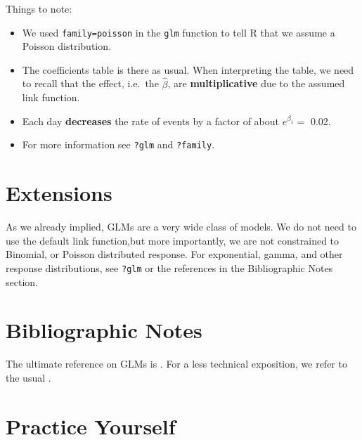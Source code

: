 \documentclass[]{book}
\providecommand{\tightlist}{%
  \setlength{\itemsep}{0pt}\setlength{\parskip}{0pt}}
\theoremstyle{definition}
\theoremstyle{definition}
\theoremstyle{definition}
\theoremstyle{remark}
\begin{document}
Things to note:

\begin{itemize}
\tightlist
\item
  We used \texttt{family=poisson} in the \texttt{glm} function to tell R
  that we assume a Poisson distribution.
\item
  The coefficients table is there as usual. When interpreting the table,
  we need to recall that the effect, i.e.~the \(\hat \beta\), are
  \textbf{multiplicative} due to the assumed link function.
\item
  Each day \textbf{decreases} the rate of events by a factor of about
  \(e^{\beta_1}=\) 0.02.
\item
  For more information see \texttt{?glm} and \texttt{?family}.
\end{itemize}

\section{Extensions}\label{extensions}

As we already implied, GLMs are a very wide class of models. We do not
need to use the default link function,but more importantly, we are not
constrained to Binomial, or Poisson distributed response. For
exponential, gamma, and other response distributions, see \texttt{?glm}
or the references in the Bibliographic Notes section.

\section{Bibliographic Notes}\label{bibliographic-notes-5}

The ultimate reference on GLMs is \citet{mccullagh1984generalized}. For
a less technical exposition, we refer to the usual
\citet{venables2013modern}.

\section{Practice Yourself}\label{practice-glm}
\end{document}
